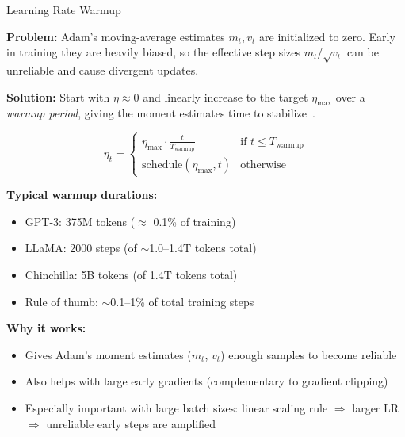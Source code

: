 \begin{frame}{Learning Rate Warmup}

  \textbf{Problem:} Adam's moving-average estimates $m_t, v_t$ are initialized to zero.
  Early in training they are heavily biased, so the effective step sizes $m_t / \sqrt{v_t}$ can be unreliable and cause divergent updates.

  \vspace{0.4em}
  \textbf{Solution:} Start with $\eta \approx 0$ and linearly increase to the target $\eta_{\max}$ over a \emph{warmup period}, giving the moment estimates time to stabilize~\cite{goyal2017accurate}.

  \[
    \eta_t = \begin{cases}
      \eta_{\max} \cdot \frac{t}{T_{\text{warmup}}} & \text{if } t \leq T_{\text{warmup}} \\
      \text{schedule}(\eta_{\max}, t) & \text{otherwise}
    \end{cases}
  \]

  \vspace{0.3em}
  \textbf{Typical warmup durations:}
  \begin{itemize}
    \item GPT-3: 375M tokens ($\approx$ 0.1\% of training)~\cite{brown2020gpt3}
    \item LLaMA: 2000 steps (of $\sim$1.0--1.4T tokens total)~\cite{touvron2023llama}
    \item Chinchilla: 5B tokens (of 1.4T tokens total)~\cite{hoffmann2022chinchilla}
    \item Rule of thumb: $\sim$0.1--1\% of total training steps
  \end{itemize}

  \vspace{0.3em}
  \textbf{Why it works:}
  \begin{itemize}
    \item Gives Adam's moment estimates ($m_t$, $v_t$) enough samples to become reliable
    \item Also helps with large early gradients (complementary to gradient clipping)
    \item Especially important with large batch sizes: linear scaling rule $\Rightarrow$ larger LR $\Rightarrow$ unreliable early steps are amplified
  \end{itemize}
\end{frame}

